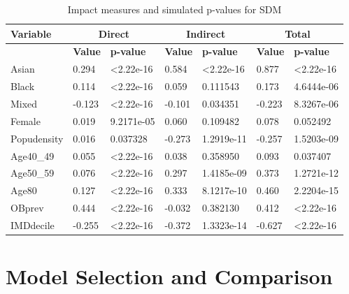 \begin{table}[]
\centering
\begin{tabular}{|l||l|l||l|l||l|l|}
\hline
\textbf{Variable} & \multicolumn{2}{c||}{\textbf{Direct}} & \multicolumn{2}{c||}{\textbf{Indirect}} & \multicolumn{2}{c|}{\textbf{Total}} \\ \hline
                  & \textbf{Value} & \textbf{p-value} & \textbf{Value} & \textbf{p-value} & \textbf{Value} & \textbf{p-value} \\ \hline
Asian             & 0.294 & \textless 2.22e-16 & 0.584 & \textless 2.22e-16 & 0.877 & \textless 2.22e-16 \\ \hline
Black             & 0.114 & \textless 2.22e-16 & 0.059 & 0.111543 & 0.173 & 4.6444e-06 \\ \hline
Mixed             & -0.123 & \textless 2.22e-16 & -0.101 & 0.034351 & -0.223 & 8.3267e-06 \\ \hline
Female            & 0.019 & 9.2171e-05 & 0.060 & 0.109482 & 0.078 & 0.052492 \\ \hline
Popudensity       & 0.016 & 0.037328 & -0.273 & 1.2919e-11 & -0.257 & 1.5203e-09 \\ \hline
Age40\_49         & 0.055 & \textless 2.22e-16 & 0.038 & 0.358950 & 0.093 & 0.037407 \\ \hline
Age50\_59         & 0.076 & \textless 2.22e-16 & 0.297 & 1.4185e-09 & 0.373 & 1.2721e-12 \\ \hline
Age80             & 0.127 & \textless 2.22e-16 & 0.333 & 8.1217e-10 & 0.460 & 2.2204e-15 \\ \hline
OBprev            & 0.444 & \textless 2.22e-16 & -0.032 & 0.382130 & 0.412 & \textless 2.22e-16 \\ \hline
IMDdecile         & -0.255 & \textless 2.22e-16 & -0.372 & 1.3323e-14 & -0.627 & \textless 2.22e-16 \\ \hline
\end{tabular}
\caption{
Impact measures and simulated p-values for SDM
}
\label{tab: A4.9}
\end{table}

\clearpage
\section{Model Selection and Comparison}
\label{chap:4.5}

